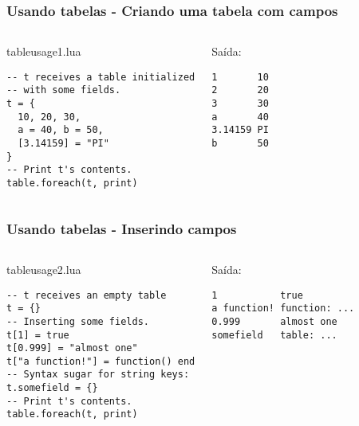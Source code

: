 \documentclass[brazil]{beamer}
\begin{document}
\begin{frame}[fragile]
  \frametitle{Usando tabelas - Criando uma tabela com campos}
  \pause
  \begin{columns}
      \begin{block}{tableusage1.lua}
        \begin{lstlisting}
-- t receives a table initialized
-- with some fields.
t = {
  10, 20, 30,
  a = 40, b = 50,
  [3.14159] = "PI"
}
-- Print t's contents.
table.foreach(t, print)
        \end{lstlisting}
      \end{block}
    \pause
      \begin{block}{Saída:}
        \begin{verbatim}
1       10
2       20
3       30
a       40
3.14159 PI
b       50  \end{verbatim}
      \end{block}
  \end{columns}
\end{frame}


\begin{frame}[fragile]
  \frametitle{Usando tabelas - Inserindo campos}
  \pause
  \begin{columns}
      \begin{block}{tableusage2.lua}
        \begin{lstlisting}
-- t receives an empty table
t = {}
-- Inserting some fields.
t[1] = true
t[0.999] = "almost one"
t["a function!"] = function() end
-- Syntax sugar for string keys:
t.somefield = {}
-- Print t's contents.
table.foreach(t, print)
        \end{lstlisting}
      \end{block}
    \pause
      \begin{block}{Saída:}
        \begin{verbatim}
1           true
a function! function: ...
0.999       almost one
somefield   table: ...    \end{verbatim}
      \end{block}
  \end{columns}
\end{frame}

\end{document}
